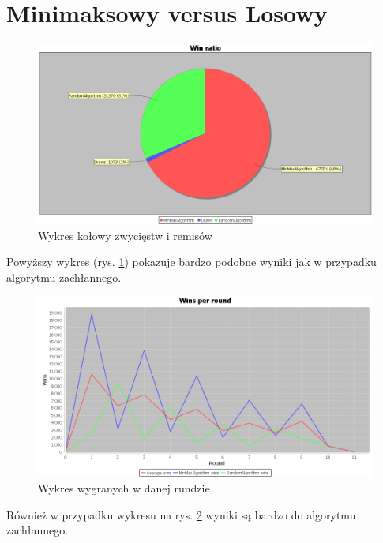 \section{Minimaksowy versus Losowy}

\begin{figure}[H]
	\centering
	\includegraphics[width=\textwidth]{Resources/MmVsR/MmVsRwin.PNG}
	\caption{Wykres kołowy zwycięstw i remisów} 
	\label{fig:MmVsRwin}
\end{figure}

Powyższy wykres (rys. \ref{fig:MmVsRwin}) pokazuje bardzo podobne wyniki jak w przypadku algorytmu zachłannego.

\begin{figure}[H]
	\centering
	\includegraphics[width=\textwidth]{Resources/MmVsR/MmVsRroundwin.PNG}
	\caption{Wykres wygranych w danej rundzie} 
	\label{fig:MmVsRroundwin}
\end{figure}

Również w przypadku wykresu na rys. \ref{fig:MmVsRroundwin} wyniki są bardzo do algorytmu zachłannego.

